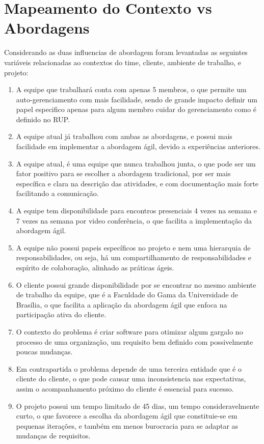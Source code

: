\section{Mapeamento do Contexto vs Abordagens} \label{mapeamento_do_contexto}

Considerando as duas influencias de abordagem foram levantadas as seguintes variáveis
relacionadas ao contextos do time, cliente, ambiente de trabalho, e projeto:

\begin{enumerate}
  \item \label{mapeamento:1} A equipe que trabalhará conta com apenas 5 membros, o que permite um
  auto-gerenciamento com mais facilidade, sendo de grande impacto definir um
  papel especifico apenas para algum membro cuidar do gerenciamento como é definido no RUP.
  \item \label{mapeamento:2} A equipe atual já trabalhou com ambas as abordagens, e possui mais facilidade
  em implementar a abordagem ágil, devido a experiências anteriores.
  \item \label{mapeamento:3} A equipe atual, é uma equipe que nunca trabalhou junta, o que pode ser um
  fator positivo para se escolher a abordagem tradicional, por ser mais específica
  e clara na descrição das atividades, e com documentação mais forte facilitando a comunicação.
  \item \label{mapeamento:4} A equipe tem disponibilidade para encontros presenciais 4 vezes na semana
  e 7 vezes na semana por video conferência, o que facilita a implementação da abordagem ágil.
  \item \label{mapeamento:5} A equipe não possui papeis específicos no projeto e nem uma hierarquia de
  responsabilidades, ou seja, há um compartilhamento de responsabilidades e espírito
  de colaboração, alinhado as práticas ágeis.
  \item \label{mapeamento:6} O cliente possui grande disponibilidade por se encontrar no mesmo ambiente
  de trabalho da equipe, que é a Faculdade do Gama da Universidade de Brasília,
  o que facilita a aplicação da abordagem ágil que enfoca na participação ativa do cliente.
  \item \label{mapeamento:7} O contexto do problema é criar software para otimizar algum gargalo no processo
  de uma organização, um requisito bem definido com possivelmente poucas mudanças.
  \item \label{mapeamento:8} Em contrapartida o problema depende de uma terceira entidade que é o cliente
  do cliente, o que pode causar uma inconsistencia nas expectativas, assim o acompanhamento
  próximo do cliente é essencial para sucesso.
  \item \label{mapeamento:9} O projeto possui um tempo limitado de 45 dias, um tempo consideravelmente curto,
  o que favorece a escolha da abordagem ágil que constituie-se em pequenas iterações,
  e também em menos burocracia para se adaptar as mudanças de requisitos.
\end{enumerate}

